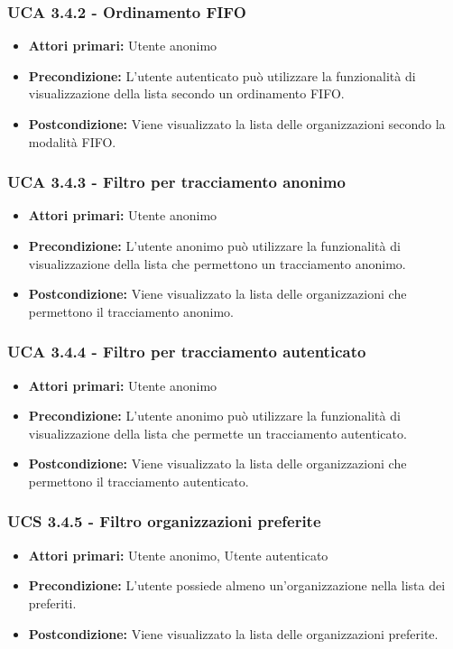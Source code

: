 \subsubsection{UCA 3.4.2 - Ordinamento FIFO}%
\begin{itemize}	
	\item \textbf{Attori primari:} Utente anonimo
	\item \textbf{Precondizione:} L'utente autenticato può utilizzare la funzionalità di visualizzazione della lista secondo un ordinamento FIFO.
	\item \textbf{Postcondizione:} Viene visualizzato la lista delle organizzazioni secondo la modalità FIFO.
\end{itemize}

\subsubsection{UCA 3.4.3 - Filtro per tracciamento anonimo}%
\begin{itemize}
	\item \textbf{Attori primari:} Utente anonimo
	\item \textbf{Precondizione:} L'utente anonimo può utilizzare la funzionalità di visualizzazione della lista che permettono un tracciamento anonimo.
	\item \textbf{Postcondizione:} Viene visualizzato la lista delle organizzazioni che permettono il tracciamento anonimo.
\end{itemize}

\subsubsection{UCA 3.4.4 - Filtro per tracciamento autenticato}%
\begin{itemize}
	\item \textbf{Attori primari:} Utente anonimo
	\item \textbf{Precondizione:} L'utente anonimo può utilizzare la funzionalità di visualizzazione della lista che permette un tracciamento autenticato.
	\item \textbf{Postcondizione:} Viene visualizzato la lista delle organizzazioni che permettono il tracciamento autenticato.
\end{itemize}

\subsubsection{UCS 3.4.5 - Filtro organizzazioni preferite}%
\begin{itemize}
	\item \textbf{Attori primari:} Utente anonimo, Utente autenticato
	\item \textbf{Precondizione:} L'utente possiede almeno un'organizzazione nella lista dei preferiti.
	\item \textbf{Postcondizione:} Viene visualizzato la lista delle organizzazioni preferite.
\end{itemize}

